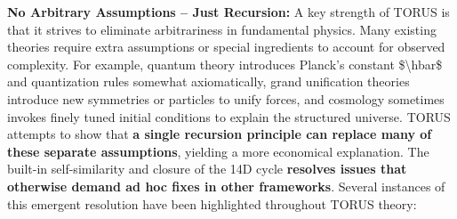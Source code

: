 \documentclass[
]{article}
\begin{document}
\textbf{No Arbitrary Assumptions -- Just Recursion:} A key strength of
TORUS is that it strives to eliminate arbitrariness in fundamental
physics. Many existing theories require extra assumptions or special
ingredients to account for observed complexity. For example, quantum
theory introduces Planck's constant \$\textbackslash hbar\$ and
quantization rules somewhat axiomatically, grand unification theories
introduce new symmetries or particles to unify forces, and cosmology
sometimes invokes finely tuned initial conditions to explain the
structured universe. TORUS attempts to show that \textbf{a single
recursion principle can replace many of these separate assumptions},
yielding a more economical explanation. The built-in self-similarity and
closure of the 14D cycle \textbf{resolves issues that otherwise demand
ad hoc fixes in other frameworks\hspace{0pt}}. Several instances of this
emergent resolution have been highlighted throughout TORUS theory:
\end{document}
